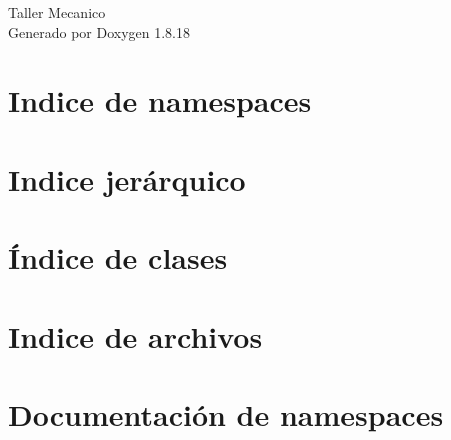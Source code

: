 \let\mypdfximage\pdfximage\def\pdfximage{\immediate\mypdfximage}\documentclass[twoside]{book}
\newcommand{\+}{\discretionary{\mbox{\scriptsize$\hookleftarrow$}}{}{}}
\newcommand{\clearemptydoublepage}{%
  \newpage{\pagestyle{empty}\cleardoublepage}%
}
\begin{document}
\hypersetup{pageanchor=false,
             bookmarksnumbered=true,
             pdfencoding=unicode
            }
\begin{titlepage}
\vspace*{7cm}
\begin{center}%
{\Large Taller Mecanico }\\
\vspace*{1cm}
{\large Generado por Doxygen 1.8.18}\\
\end{center}
\end{titlepage}
\clearemptydoublepage
{}
\tableofcontents
\clearemptydoublepage
{}
\hypersetup{pageanchor=true}

\chapter{Indice de namespaces}

\chapter{Indice jerárquico}

\chapter{Índice de clases}

\chapter{Indice de archivos}

\chapter{Documentación de namespaces}
























\end{document}
